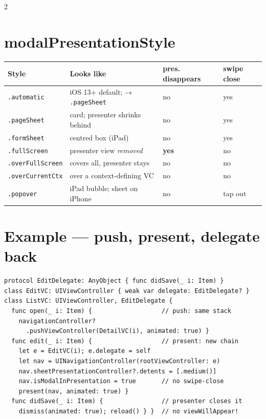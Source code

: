 \documentclass[8pt]{extarticle}
\begin{document}
\begin{multicols}{2}
\section{modalPresentationStyle}
{\footnotesize
\begin{tabular}{@{}>{\raggedright\arraybackslash}p{21mm}>{\raggedright\arraybackslash}p{33mm}>{\raggedright\arraybackslash}p{9mm}>{\raggedright\arraybackslash}p{9mm}@{}}
\toprule
\textbf{Style} & \textbf{Looks like} & \textbf{pres. dis\-appears} & \textbf{swipe close} \\
\midrule
\texttt{.automatic} & iOS 13+ default; → \texttt{.pageSheet} & no & yes \\
\texttt{.pageSheet} & card; presenter shrinks behind & no & yes \\
\texttt{.formSheet} & centred box (iPad) & no & yes \\
\texttt{.fullScreen} & presenter view \emph{removed} & \textbf{yes} & no \\
\texttt{.overFullScreen} & covers all, presenter stays & no & no \\
\texttt{.overCurrentCtx} & over a context-defining VC & no & no \\
\texttt{.popover} & iPad bubble; sheet on iPhone & no & tap out \\
\bottomrule
\end{tabular}}

\section{Example — push, present, delegate back}
\begin{lstlisting}[language=SwiftSheet]
protocol EditDelegate: AnyObject { func didSave(_ i: Item) }
class EditVC: UIViewController { weak var delegate: EditDelegate? }
class ListVC: UIViewController, EditDelegate {
  func open(_ i: Item) {                   // push: same stack
    navigationController?
      .pushViewController(DetailVC(i), animated: true) }
  func edit(_ i: Item) {                   // present: new chain
    let e = EditVC(i); e.delegate = self
    let nav = UINavigationController(rootViewController: e)
    nav.sheetPresentationController?.detents = [.medium()]
    nav.isModalInPresentation = true       // no swipe-close
    present(nav, animated: true) }
  func didSave(_ i: Item) {                // presenter closes it
    dismiss(animated: true); reload() } }  // no viewWillAppear!
\end{lstlisting}

\columnbreak


\end{multicols}
\end{document}
